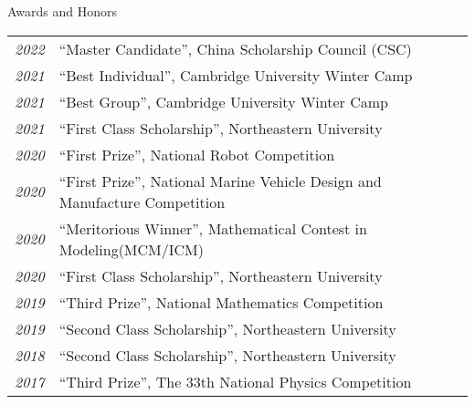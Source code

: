 \begin{rSection}{Awards and Honors}
    \begin{tabular}{ @{} >{\itshape}l @{\hspace{6ex}} l }
    2022		& ``Master Candidate'', China Scholarship Council (CSC) \\
    2021        & ``Best Individual'', Cambridge University Winter Camp\\  
    2021        & ``Best Group'', Cambridge University Winter Camp\\  
    2021        & ``First Class Scholarship'', Northeastern University\\
    2020        & ``First Prize'', National Robot Competition\\
    2020        & ``First Prize'', National Marine Vehicle Design and Manufacture Competition\\
    2020        & ``Meritorious Winner'', Mathematical Contest in Modeling(MCM/ICM)\\
    2020        & ``First Class Scholarship'', Northeastern University\\
    2019        & ``Third Prize'', National Mathematics Competition\\
    2019        & ``Second Class Scholarship'', Northeastern University\\
    2018        & ``Second Class Scholarship'', Northeastern University\\
	2017        & ``Third Prize'', The 33th National Physics Competition\\
    \end{tabular}
\end{rSection}

